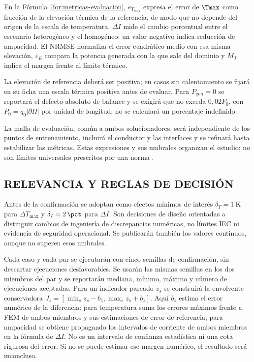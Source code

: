 En la Fórmula~\ref{for:metricas-evaluacion}, $e_{T_{\max}}$ expresa el error de $\Tmax$ como fracción de la elevación térmica de la referencia, de modo que no depende del origen de la escala de temperatura. $\Delta I$ mide el cambio porcentual entre el escenario heterogéneo y el homogéneo: un valor negativo indica reducción de ampacidad. El NRMSE normaliza el error cuadrático medio con esa misma elevación, $\varepsilon_E$ compara la potencia generada con la que sale del dominio y $M_T$ indica el margen frente al límite térmico.

La elevación de referencia deberá ser positiva; en casos sin calentamiento se fijará en su ficha una escala térmica positiva antes de evaluar. Para $P_{\mathrm{gen}}=0$ se reportará el defecto absoluto de balance y se exigirá que no exceda $0{,}02P_0$, con $P_0=q_0|\partial\Omega|$ por unidad de longitud; no se calculará un porcentaje indefinido.

La malla de evaluación, común a ambos solucionadores, será independiente de los puntos de entrenamiento, incluirá el conductor y las interfaces y se refinará hasta estabilizar las métricas. Estas expresiones y sus umbrales organizan el estudio; no son límites universales prescritos por una norma \parencite[350--351]{gregor2013}.

\subsection{RELEVANCIA Y REGLAS DE DECISIÓN}
\label{subsec:relevancia-decision}

Antes de la confirmación se adoptan como efectos mínimos de interés $\delta_T=\SI{1}{\kelvin}$ para $\Delta T_{\max}$ y $\delta_I=2\,\pct$ para $\Delta I$. Son decisiones de diseño orientadas a distinguir cambios de ingeniería de discrepancias numéricas, no límites IEC ni evidencia de seguridad operacional. Se publicarán también los valores continuos, aunque no superen esos umbrales.

Cada caso y cada par se ejecutarán con cinco semillas de confirmación, sin descartar ejecuciones desfavorables. Se usarán las mismas semillas en los dos miembros del par y se reportarán mediana, mínimo, máximo y número de ejecuciones aceptadas. Para un indicador pareado $z_s$ se construirá la envolvente conservadora $J_z=[\min_s z_s-b_z,\max_s z_s+b_z]$. Aquí $b_z$ estima el error numérico de la diferencia: para temperatura suma los errores máximos frente a FEM de ambos miembros y sus estimaciones de error de referencia; para ampacidad se obtiene propagando los intervalos de corriente de ambos miembros en la fórmula de $\Delta I$. No es un intervalo de confianza estadística ni una cota rigurosa del error. Si no se puede estimar ese margen numérico, el resultado será inconcluso.


